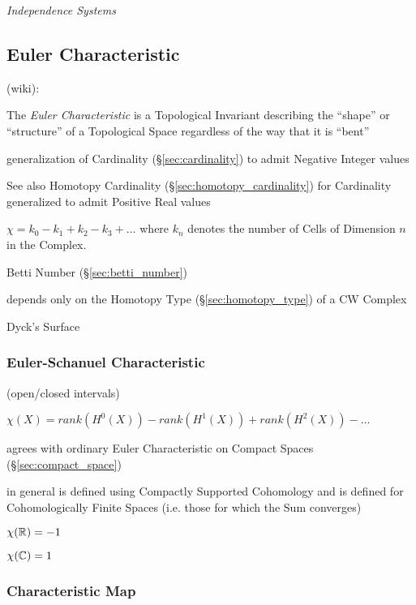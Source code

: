 \emph{Independence Systems}



\subsection{Euler Characteristic}\label{sec:euler_characteristic}

(wiki):

The \emph{Euler Characteristic} is a Topological Invariant describing the
``shape'' or ``structure'' of a Topological Space regardless of the way that it
is ``bent''

generalization of Cardinality (\S\ref{sec:cardinality}) to admit
Negative Integer values

\fist See also Homotopy Cardinality (\S\ref{sec:homotopy_cardinality})
for Cardinality generalized to admit Positive Real values

$\chi = k_0 - k_1 + k_2 - k_3 + \ldots$ where $k_n$ denotes the number
of Cells of Dimension $n$ in the Complex.

Betti Number (\S\ref{sec:betti_number})

depends only on the Homotopy Type (\S\ref{sec:homotopy_type}) of a
CW Complex \cite{hatcher02}

Dyck's Surface



\subsubsection{Euler-Schanuel Characteristic}\label{sec:euler_schanuel}

(open/closed intervals) %

$\chi(X) = rank (H^0(X)) - rank (H^1(X)) + rank (H^2(X)) - \ldots$

agrees with ordinary Euler Characteristic on Compact Spaces
(\S\ref{sec:compact_space})

in general is defined using Compactly Supported Cohomology and is
defined for Cohomologically Finite Spaces (i.e. those for which the
Sum converges) %

$\chi(\mathbb{R}) = -1$

$\chi(\mathbb{C}) = 1$



\subsubsection{Characteristic Map}\label{sec:characteristic_map}

